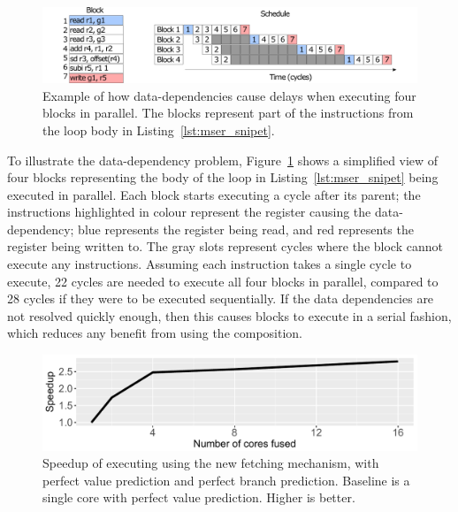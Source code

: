 \begin{figure}[t]
    \centering
    \includegraphics[width=1\textwidth]{chapter3/graphics/mser_ex.pdf}
    \caption{Example of how data-dependencies cause delays when executing four blocks in parallel. The blocks represent part of the instructions from the loop body in Listing~\ref{lst:mser_snipet}.}
    \label{fig:mser_nvsited}
	\vspace{1em}
\end{figure}


To illustrate the data-dependency problem, Figure~\ref{fig:mser_nvsited} shows a simplified view of four blocks representing the body of the loop in Listing~\ref{lst:mser_snipet} being executed in parallel.
Each block starts executing a cycle after its parent; the instructions highlighted in colour represent the register causing the data-dependency; blue represents the register being read, and red represents the register being written to.
The gray slots represent cycles where the block cannot execute any instructions.
Assuming each instruction takes a single cycle to execute, 22 cycles are needed to execute all four blocks in parallel, compared to 28 cycles if they were to be executed sequentially.
If the data dependencies are not resolved quickly enough, then this causes blocks to execute in a serial fashion, which reduces any benefit from using the composition.

\begin{figure}[t]
    \centering
    \includegraphics[width=1\textwidth]{chapter3/graphics/mser_motiv_reg.pdf}
    \caption{Speedup of executing  using the new fetching mechanism, with perfect value prediction and perfect branch prediction. Baseline is a single core with perfect value prediction. Higher is better.}
    \label{fig:motivation_reg}
	\vspace{1em}
\end{figure}


